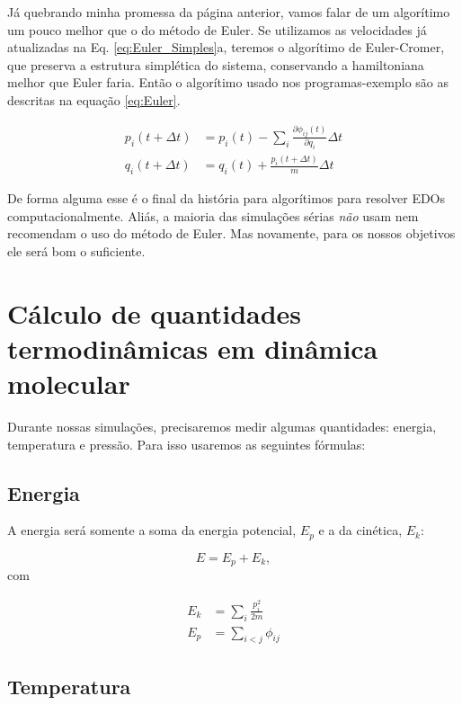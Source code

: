\documentclass[twoside, a4paper]{scrartcl}
\newcommand{\phiij}{\phi_{ij}}
\newcommand{\del}[2]{\frac{\partial #1}{\partial #2}}
\begin{document}
Já quebrando minha promessa da página anterior, vamos falar de um algorítimo um pouco melhor que o do método de Euler. Se utilizamos as velocidades já atualizadas na Eq. \ref{eq:Euler_Simples}a, teremos o algorítimo de Euler-Cromer, que preserva a estrutura simplética do sistema, conservando a hamiltoniana melhor que Euler faria. Então o algorítimo usado nos programas-exemplo são as descritas na equação \ref{eq:Euler}.

\begin{subequations}
	\begin{align}
		p_i(t+\Delta t) &= p_i(t) -\sum_i \del{\phiij(t)}{q_i} \Delta t \\
		q_i(t+\Delta t) &= q_i(t) + \frac{p_i(t+\Delta t)}{m} \Delta t
	\end{align}
	\label{eq:Euler}
\end{subequations}

De forma alguma esse é o final da história para algorítimos para resolver EDOs computacionalmente. Aliás, a maioria das simulações sérias \emph{não} usam nem recomendam o uso do método de Euler. Mas novamente, para os nossos objetivos ele será bom o suficiente.

\section{Cálculo de quantidades termodinâmicas em dinâmica molecular}

Durante nossas simulações, precisaremos medir algumas quantidades: energia, temperatura e pressão. Para isso usaremos as seguintes fórmulas:

\subsection{Energia}

A energia será somente a soma da energia potencial, $E_p$ e a da cinética, $E_k$:

\begin{equation}
	E = E_p + E_k,
\end{equation}
com 

\begin{subequations}
	\begin{align}
		E_k &= \sum_i  \frac{p_i^2}{2m} \\ 
		E_p &= \sum_{i < j}  \phiij
	\end{align}
\end{subequations}

\subsection{Temperatura}
\end{document}
